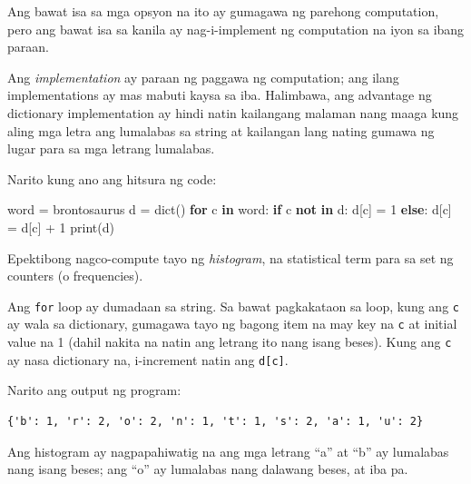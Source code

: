 \documentclass[10pt,]{book}
\newenvironment{Shaded}{}{}
\newcommand{\BuiltInTok}[1]{\textcolor[rgb]{0.00,0.50,0.00}{#1}}
\newcommand{\ControlFlowTok}[1]{\textcolor[rgb]{0.00,0.44,0.13}{\textbf{#1}}}
\newcommand{\DecValTok}[1]{\textcolor[rgb]{0.25,0.63,0.44}{#1}}
\newcommand{\KeywordTok}[1]{\textcolor[rgb]{0.00,0.44,0.13}{\textbf{#1}}}
\newcommand{\NormalTok}[1]{#1}
\newcommand{\OperatorTok}[1]{\textcolor[rgb]{0.40,0.40,0.40}{#1}}
\newcommand{\StringTok}[1]{\textcolor[rgb]{0.25,0.44,0.63}{#1}}
\begin{document}
Ang bawat isa sa mga opsyon na ito ay gumagawa ng parehong computation,
pero ang bawat isa sa kanila ay nag-i-implement ng computation na iyon
sa ibang paraan.


Ang \emph{implementation} ay paraan ng paggawa ng computation; ang ilang
implementations ay mas mabuti kaysa sa iba. Halimbawa, ang advantage ng
dictionary implementation ay hindi natin kailangang malaman nang maaga
kung aling mga letra ang lumalabas sa string at kailangan lang nating
gumawa ng lugar para sa mga letrang lumalabas.

Narito kung ano ang hitsura ng code:

\begin{Shaded}
\begin{Highlighting}[]
\NormalTok{word }\OperatorTok{=} \StringTok{\textquotesingle{}brontosaurus\textquotesingle{}}
\NormalTok{d }\OperatorTok{=} \BuiltInTok{dict}\NormalTok{()}
\ControlFlowTok{for}\NormalTok{ c }\KeywordTok{in}\NormalTok{ word:}
    \ControlFlowTok{if}\NormalTok{ c }\KeywordTok{not} \KeywordTok{in}\NormalTok{ d:}
\NormalTok{        d[c] }\OperatorTok{=} \DecValTok{1}
    \ControlFlowTok{else}\NormalTok{:}
\NormalTok{        d[c] }\OperatorTok{=}\NormalTok{ d[c] }\OperatorTok{+} \DecValTok{1}
\BuiltInTok{print}\NormalTok{(d)}
\end{Highlighting}
\end{Shaded}

Epektibong nagco-compute tayo ng \emph{histogram}, na statistical term
para sa set ng counters (o frequencies).

  

Ang \texttt{for} loop ay dumadaan sa string. Sa bawat pagkakataon sa
loop, kung ang \texttt{c} ay wala sa dictionary, gumagawa tayo ng bagong
item na may key na \texttt{c} at initial value na 1 (dahil nakita na
natin ang letrang ito nang isang beses). Kung ang \texttt{c} ay nasa
dictionary na, i-increment natin ang \texttt{d{[}c{]}}.


Narito ang output ng program:

{\small
\begin{verbatim}
{'b': 1, 'r': 2, 'o': 2, 'n': 1, 't': 1, 's': 2, 'a': 1, 'u': 2}
\end{verbatim}
}

Ang histogram ay nagpapahiwatig na ang mga letrang ``a'' at ``b'' ay
lumalabas nang isang beses; ang ``o'' ay lumalabas nang dalawang beses,
at iba pa.
\end{document}
